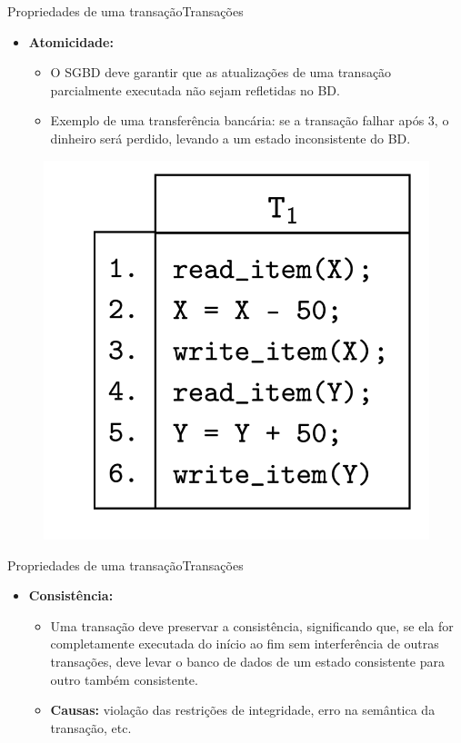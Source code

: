 \documentclass[t]{beamer}
\begin{document}
\begin{ftst}{Propriedades de uma transação}{Transações}

\begin{itemize}
    \item \textbf{Atomicidade:} 
    \vone
    \begin{itemize}
        \item O SGBD deve garantir que as atualizações de uma transação parcialmente executada não sejam refletidas no BD.
        \item Exemplo de uma transferência bancária: se a transação falhar após 3, o dinheiro será perdido, levando a um estado inconsistente do BD. 
    \end{itemize}
\end{itemize}
    \begin{figure}
        \centering
        \includegraphics[scale=0.15]{Figuras_transacoes/4.png}
    \end{figure}
\end{ftst}


\begin{ftst}{Propriedades de uma transação}{Transações}

\begin{itemize}
    \item \textbf{Consistência:} 
    \vone
    \begin{itemize}
        \item Uma transação deve preservar a consistência, significando que, se ela for completamente executada do início ao fim sem interferência de outras transações, deve levar o banco de dados de um estado consistente para outro também consistente. 
        \item \textbf{Causas:} violação das restrições de integridade, erro na semântica da transação, etc.
    \end{itemize}
\end{itemize}

\end{ftst}
\end{document}
